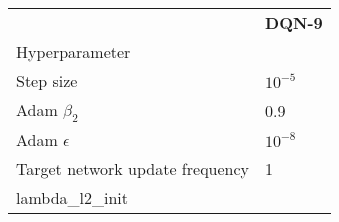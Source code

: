 \begin{tabular}{ll}
 & \bfseries DQN-9 \\
Hyperparameter &  \\
Step size & $10^{-5}$ \\
Adam $\beta_2$ & 0.9 \\
Adam $\epsilon$ & $10^{-8}$ \\
Target network update frequency & 1 \\
lambda_l2_init &  \\
\end{tabular}
